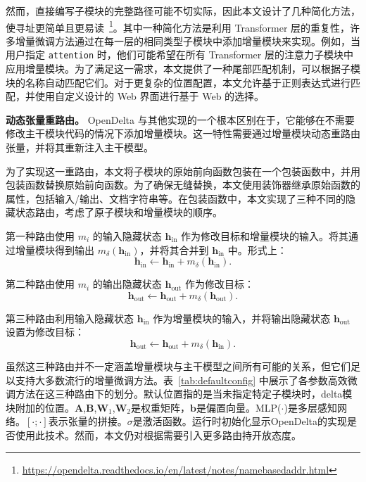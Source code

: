 然而，直接编写子模块的完整路径可能不切实际，因此本文设计了几种简化方法，使寻址更简单且更易读~\footnote{\url{https://opendelta.readthedocs.io/en/latest/notes/namebasedaddr.html}}。其中一种简化方法是利用 Transformer 层的重复性，许多增量微调方法通过在每一层的相同类型子模块中添加增量模块来实现。例如，当用户指定 \texttt{attention} 时，他们可能希望在所有 Transformer 层的注意力子模块中应用增量模块。为了满足这一需求，本文提供了一种尾部匹配机制，可以根据子模块的名称自动匹配它们。对于更复杂的位置配置，本文允许基于正则表达式进行匹配，并使用自定义设计的 Web 界面进行基于 Web 的选择。

\textbf{动态张量重路由。} OpenDelta 与其他实现的一个根本区别在于，它能够在不需要修改主干模块代码的情况下添加增量模块。这一特性需要通过增量模块动态重路由张量，并将其重新注入主干模型。

为了实现这一重路由，本文将子模块的原始前向函数包装在一个包装函数中，并用包装函数替换原始前向函数。为了确保无缝替换，本文使用装饰器继承原始函数的属性，包括输入/输出、文档字符串等。在包装函数中，本文实现了三种不同的隐藏状态路由，考虑了原子模块和增量模块的顺序。

第一种路由使用 $m_i$ 的输入隐藏状态 $\mathbf{h}_\text{in}$ 作为修改目标和增量模块的输入。将其通过增量模块得到输出 $m_\delta(\mathbf{h}_\text{in})$，并将其合并到 $\mathbf{h}_\text{in}$ 中。形式上：
\begin{equation}
\label{equ:in}
\mathbf{h}_\text{in}\leftarrow\mathbf{h}_\text{in} + m_\delta(\mathbf{h}_\text{in}).
\end{equation}

第二种路由使用 $m_i$ 的输出隐藏状态 $\mathbf{h}_\text{out}$ 作为修改目标：
\begin{equation}
\label{equ:after}
\mathbf{h}_\text{out}\leftarrow\mathbf{h}_\text{out} + m_\delta(\mathbf{h}_\text{out}).
\end{equation}

第三种路由利用输入隐藏状态 $\mathbf{h}_\text{in}$ 作为增量模块的输入，并将输出隐藏状态 $\mathbf{h}_\text{out}$ 设置为修改目标：
\begin{equation}
\label{equ:para}
\mathbf{h}_{\text{out}}\leftarrow\mathbf{h}_\text{out} + m_\delta(\mathbf{h}_\text{in}).
\end{equation}

虽然这三种路由并不一定涵盖增量模块与主干模型之间所有可能的关系，但它们足以支持大多数流行的增量微调方法。表~\ref{tab:defaultconfig} 中展示了各参数高效微调方法在这三种路由下的划分。默认位置指的是当未指定特定子模块时，delta模块附加的位置。$\mathbf{A}$,$\mathbf{B}$,$\mathbf{W}_1$,$\mathbf{W}_2$是权重矩阵，$\mathbf{b}$是偏置向量。MLP($\cdot$)是多层感知网络。$[\cdot;\cdot]$表示张量的拼接。$\sigma$是激活函数。运行时初始化显示OpenDelta的实现是否使用此技术。然而，本文仍对根据需要引入更多路由持开放态度。

